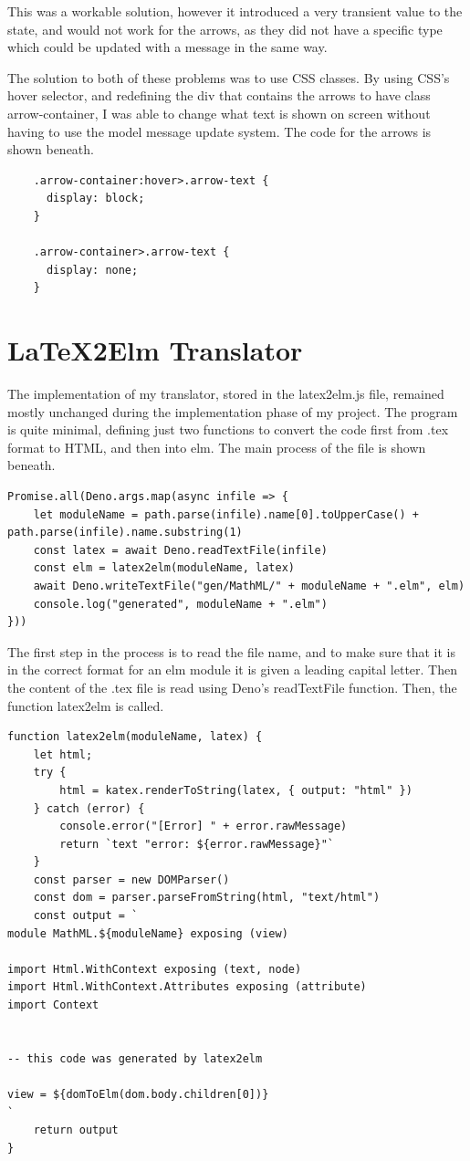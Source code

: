 \documentclass{l4proj}
\begin{document}
This was a workable solution, however it introduced a very transient value to the state, and would not work for the arrows, as they did not have a specific type which could be updated with a message in the same way.

The solution to both of these problems was to use CSS classes.  By using CSS's hover selector, and redefining the div that contains the arrows to have class arrow-container, I was able to change what text is shown on screen without having to use the model message update system.  The code for the arrows is shown beneath.

\begin{lstlisting}
    .arrow-container:hover>.arrow-text {
      display: block;
    }

    .arrow-container>.arrow-text {
      display: none;
    }
\end{lstlisting}

\section{LaTeX2Elm Translator}

The implementation of my translator, stored in the latex2elm.js file, remained mostly unchanged during the implementation phase of my project.  The program is quite minimal, defining just two functions to convert the code first from .tex format to HTML, and then into elm.  The main process of the file is shown beneath.

\begin{lstlisting}
Promise.all(Deno.args.map(async infile => {
    let moduleName = path.parse(infile).name[0].toUpperCase() +                     path.parse(infile).name.substring(1)
    const latex = await Deno.readTextFile(infile)
    const elm = latex2elm(moduleName, latex)
    await Deno.writeTextFile("gen/MathML/" + moduleName + ".elm", elm)
    console.log("generated", moduleName + ".elm")
}))
\end{lstlisting}

The first step in the process is to read the file name, and to make sure that it is in the correct format for an elm module it is given a leading capital letter.  Then the content of the .tex file is read using Deno's readTextFile function.  Then, the function latex2elm is called.

\begin{lstlisting}
function latex2elm(moduleName, latex) {
    let html;
    try {
        html = katex.renderToString(latex, { output: "html" })
    } catch (error) {
        console.error("[Error] " + error.rawMessage)
        return `text "error: ${error.rawMessage}"`
    }
    const parser = new DOMParser()
    const dom = parser.parseFromString(html, "text/html")
    const output = `
module MathML.${moduleName} exposing (view)

import Html.WithContext exposing (text, node)
import Html.WithContext.Attributes exposing (attribute)
import Context


-- this code was generated by latex2elm

view = ${domToElm(dom.body.children[0])}
`
    return output
}
\end{lstlisting}
\end{document}
